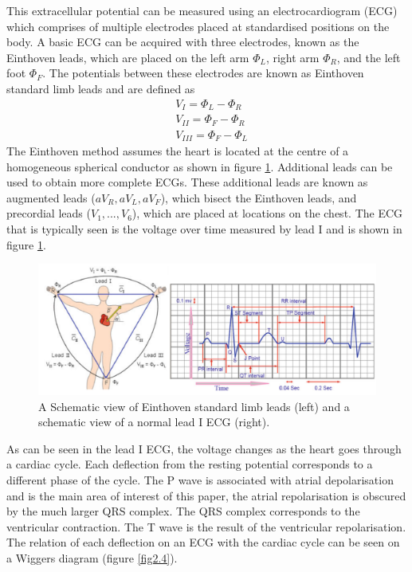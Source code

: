 This extracellular potential can be measured using an electrocardiogram (ECG) which comprises of multiple electrodes placed at standardised positions on the body. A basic ECG can be acquired with three electrodes, known as the Einthoven leads, which are placed on the left arm $\Phi_L$, right arm $\Phi_R$, and the left foot $\Phi_F$. The potentials between these electrodes are known as Einthoven standard limb leads and are defined as
\begin{equation}
    \begin{split}
        & V_I = \Phi_L - \Phi_R \\
        & V_{II} = \Phi_F - \Phi_R \\
        & V_{III} = \Phi_F - \Phi_L
    \end{split}
    \label{Eq2.1}
\end{equation}
The Einthoven method assumes the heart is located at the centre of a homogeneous spherical conductor as shown in figure \ref{fig2.3}. Additional leads can be used to obtain more complete ECGs. These additional leads are known as augmented leads ($aV_R, aV_L, aV_F$), which bisect the Einthoven leads, and precordial leads ($V_1, ..., V_6$), which are placed at locations on the chest. The ECG that is typically seen is the voltage over time measured by lead I and is shown in figure \ref{fig2.3}.
\begin{figure}[H]
    \centering
    \includegraphics[width=1\textwidth]{images/ECGbasics.png}
    \caption{A Schematic view of Einthoven standard limb leads (left) and a schematic view of a normal lead I ECG (right). \citep{ecg}}
    \label{fig2.3}
\end{figure}
As can be seen in the lead I ECG, the voltage changes as the heart goes through a cardiac cycle. Each deflection from the resting potential corresponds to a different phase of the cycle. The P wave is associated with atrial depolarisation and is the main area of interest of this paper, the atrial repolarisation is obscured by the much larger QRS complex. The QRS complex corresponds to the ventricular contraction. The T wave is the result of the ventricular repolarisation. The relation of each deflection on an ECG with the cardiac cycle can be seen on a Wiggers diagram (figure \ref{fig2.4}).\par
